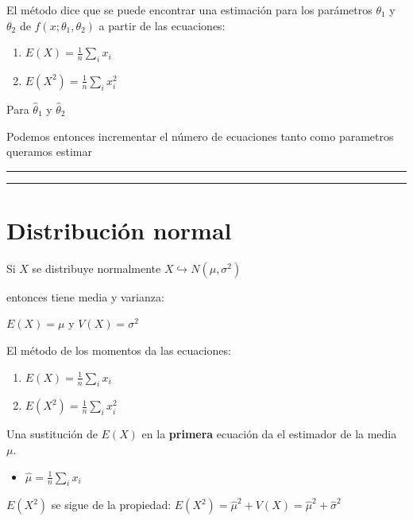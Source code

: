 \documentclass[
]{book}
\providecommand{\tightlist}{%
  \setlength{\itemsep}{0pt}\setlength{\parskip}{0pt}}
\begin{document}
El método dice que se puede encontrar una estimación para los parámetros \(\theta_1\) y \(\theta_2\) de \(f(x;\theta_1,\theta_2)\) a partir de las ecuaciones:

\begin{enumerate}
\def\labelenumi{\arabic{enumi}.}
\item
  \(E(X)= \frac{1}{n}\sum_i x_i\)
\item
  \(E(X^2)=\frac{1}{n}\sum_i x^2_i\)
\end{enumerate}

Para \(\hat{\theta}_1\) y \(\hat{\theta}_2\)

Podemos entonces incrementar el número de ecuaciones tanto como parametros queramos estimar

\begin{center}\rule{0.5\linewidth}{0.5pt}\end{center}

\begin{center}\rule{0.5\linewidth}{0.5pt}\end{center}

\hypertarget{distribuciuxf3n-normal-13}{%
\section{Distribución normal}\label{distribuciuxf3n-normal-13}}

Si \(X\) se distribuye normalmente
\(X \hookrightarrow N(\mu, \sigma^2)\)

entonces tiene media y varianza:

\(E(X)=\mu\) y
\(V(X)=\sigma^2\)

El método de los momentos da las ecuaciones:

\begin{enumerate}
\def\labelenumi{\arabic{enumi}.}
\tightlist
\item
  \(E(X)=\frac{1}{n}\sum_i x_i\)
\item
  \(E(X^2)=\frac{1}{n}\sum_i x^2_i\)
\end{enumerate}

Una sustitución de \(E(X)\) en la \textbf{primera} ecuación da el estimador de la media \(\mu\).

\begin{itemize}
\tightlist
\item
  \(\hat{\mu}=\frac{1}{n}\sum_i x_i\)
\end{itemize}

\(E(X^2)\) se sigue de la propiedad: \(E(X^2) = \hat{\mu}^2 + V(X)= \hat{\mu}^2+\hat{\sigma} ^2\)
\end{document}
